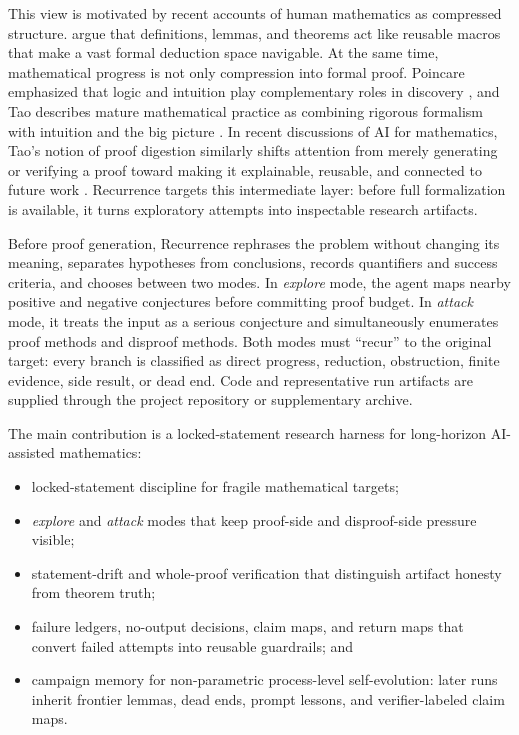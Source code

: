 \documentclass{article}
\theoremstyle{definition}
\theoremstyle{remark}
\begin{document}
This view is motivated by recent accounts of human mathematics as compressed structure. \citet{aksenov2026compression} argue that definitions, lemmas, and theorems act like reusable macros that make a vast formal deduction space navigable. At the same time, mathematical progress is not only compression into formal proof. Poincare emphasized that logic and intuition play complementary roles in discovery \citep{poincare1905intuition}, and Tao describes mature mathematical practice as combining rigorous formalism with intuition and the big picture \citep{tao2007rigour}. In recent discussions of AI for mathematics, Tao's notion of proof digestion similarly shifts attention from merely generating or verifying a proof toward making it explainable, reusable, and connected to future work \citep{stanford2026futuremath,ghosal2026futuremath}. Recurrence targets this intermediate layer: before full formalization is available, it turns exploratory attempts into inspectable research artifacts.

Before proof generation, Recurrence rephrases the problem without changing its meaning, separates hypotheses from conclusions, records quantifiers and success criteria, and chooses between two modes. In \emph{explore} mode, the agent maps nearby positive and negative conjectures before committing proof budget. In \emph{attack} mode, it treats the input as a serious conjecture and simultaneously enumerates proof methods and disproof methods. Both modes must ``recur'' to the original target: every branch is classified as direct progress, reduction, obstruction, finite evidence, side result, or dead end. Code and representative run artifacts are supplied through the project repository or supplementary archive.

The main contribution is a locked-statement research harness for long-horizon AI-assisted mathematics:
\begin{itemize}
  \item locked-statement discipline for fragile mathematical targets;
  \item \emph{explore} and \emph{attack} modes that keep proof-side and disproof-side pressure visible;
  \item statement-drift and whole-proof verification that distinguish artifact honesty from theorem truth;
  \item failure ledgers, no-output decisions, claim maps, and return maps that convert failed attempts into reusable guardrails; and
  \item campaign memory for non-parametric process-level self-evolution: later runs inherit frontier lemmas, dead ends, prompt lessons, and verifier-labeled claim maps.
\end{itemize}
\end{document}
